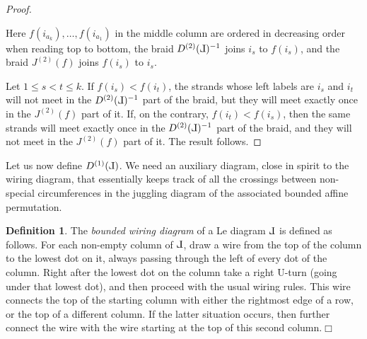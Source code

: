 \documentclass[10pt]{amsart}
\theoremstyle{plain}
\theoremstyle{definition}
\newtheorem{definition}[thm]{Definition}
\theoremstyle{remark}
\numberwithin{equation}{section}
\newcommand{\Jb}{J^{(2)}}
\newcommand{\MG}[1]{{\color{teal}{{\bf Misha}: #1}}}
\def\Le{\reflectbox{$\mathrm{L}$}}
\begin{document}
\begin{proof}
\begin{center}
\end{center}

Here $f(i_{a_k}), \dots, f(i_{a_1})$ in the middle column are ordered in decreasing order when reading top to bottom, the braid $D^{(2)}(\Le)^{-1}$ joins $i_{s}$ to $f(i_{s})$, and the braid $\Jb(f)$ joins $f(i_{s})$ to $i_s$.

Let $1 \leq s < t \leq k$. If $f(i_s) < f(i_t)$, the strands whose left labels are $i_s$ and $i_t$ will not meet in the $D^{(2)}(\Le)^{-1}$ part of the braid, but they will meet exactly once in the $\Jb(f)$ part of it. If, on the contrary, $f(i_t) < f(i_s)$, then the same strands will meet exactly once in the $D^{(2)}(\Le)^{-1}$ part of the braid, and they will not meet in the $\Jb(f)$ part of it. The result follows. 
\end{proof}

Let us now define $D^{(1)}(\Le)$. We need an auxiliary diagram, close in spirit to the wiring diagram, that essentially keeps track of all the crossings between non-special circumferences in the juggling diagram of the associated bounded affine permutation. 

\begin{definition}\label{def:bounded wiring}
The \emph{bounded wiring diagram} of a Le diagram $\Le$ is defined as follows. For each non-empty column of $\Le$, draw a wire from the top of the column to the lowest dot on it, always passing through the left of every dot of the column. Right after the lowest dot on the column take a right U-turn (going under that lowest dot), and then proceed with the usual wiring rules. This wire connects the top of the starting column with either the rightmost edge of a row, or the top of a different column. If the latter situation occurs, then further connect the wire with the wire starting at the top of this second column.\hfill$\Box$
\end{definition}
\end{document}
